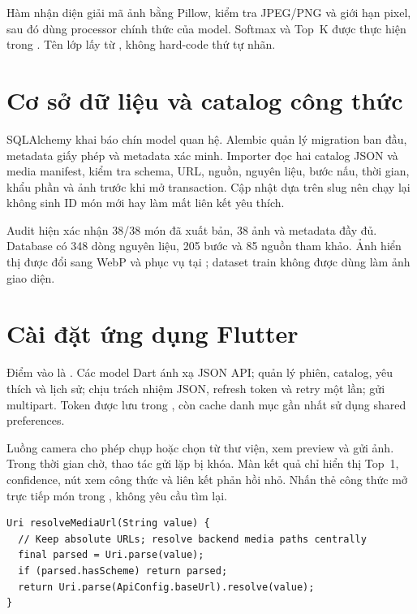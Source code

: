 Hàm nhận diện giải mã ảnh bằng Pillow, kiểm tra JPEG/PNG và giới hạn pixel,
sau đó dùng processor chính thức của model. Softmax và Top~K được thực hiện
trong . Tên lớp lấy từ , không
hard-code thứ tự nhãn.

\section{Cơ sở dữ liệu và catalog công thức}

SQLAlchemy khai báo chín model quan hệ. Alembic quản lý migration ban đầu,
metadata giấy phép và metadata xác minh. Importer đọc hai catalog JSON và
media manifest, kiểm tra schema, URL, nguồn, nguyên liệu, bước nấu, thời gian,
khẩu phần và ảnh trước khi mở transaction. Cập nhật dựa trên slug nên chạy
lại không sinh ID món mới hay làm mất liên kết yêu thích.

Audit hiện xác nhận 38/38 món đã xuất bản, 38 ảnh và metadata đầy đủ. Database
có 348 dòng nguyên liệu, 205 bước và 85 nguồn tham khảo. Ảnh hiển thị được đổi
sang WebP và phục vụ tại ; dataset train không được dùng
làm ảnh giao diện.

\section{Cài đặt ứng dụng Flutter}

Điểm vào là . Các model Dart ánh xạ JSON API;
 quản lý phiên, catalog, yêu thích và lịch sử;
 chịu trách nhiệm JSON, refresh token và retry một lần;
 gửi multipart. Token được lưu trong
, còn cache danh mục gần nhất sử dụng shared
preferences.

Luồng camera cho phép chụp hoặc chọn từ thư viện, xem preview và gửi ảnh.
Trong thời gian chờ, thao tác gửi lặp bị khóa. Màn kết quả chỉ hiển thị Top~1,
confidence, nút xem công thức và liên kết phản hồi nhỏ. Nhấn thẻ công thức mở
trực tiếp món trong , không yêu cầu tìm lại.

\begin{lstlisting}[caption={Ghép URL ảnh tương đối với base URL phía client.}, label={lst:image-url}]
Uri resolveMediaUrl(String value) {
  // Keep absolute URLs; resolve backend media paths centrally
  final parsed = Uri.parse(value);
  if (parsed.hasScheme) return parsed;
  return Uri.parse(ApiConfig.baseUrl).resolve(value);
}
\end{lstlisting}

